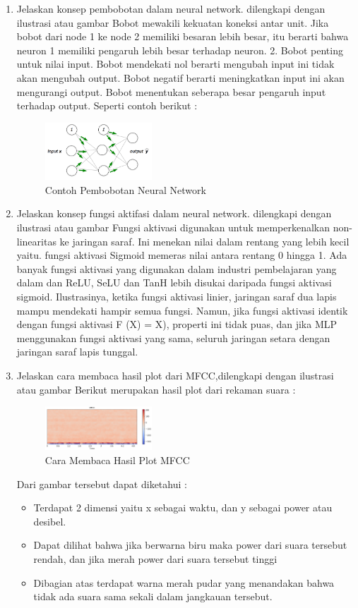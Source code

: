 \begin{enumerate}
	\item Jelaskan konsep pembobotan dalam neural network. dilengkapi dengan ilustrasi atau gambar
	\hfill\break
	Bobot mewakili kekuatan koneksi antar unit. Jika bobot dari node 1 ke node 2 memiliki besaran lebih besar, itu berarti bahwa neuron 1 memiliki pengaruh lebih besar terhadap neuron. 2. Bobot penting untuk nilai input. Bobot mendekati nol berarti mengubah input ini tidak akan mengubah output. Bobot negatif berarti meningkatkan input ini akan mengurangi output. Bobot menentukan seberapa besar pengaruh input terhadap output. Seperti contoh berikut :
	\begin{figure}[H]
		\includegraphics[width=4cm]{figures/1174087/6/2.png}
		\centering
		\caption{Contoh Pembobotan Neural Network}
	\end{figure}

	\item Jelaskan konsep fungsi aktifasi dalam neural network. dilengkapi dengan ilustrasi atau gambar
	\hfill\break
	Fungsi aktivasi digunakan untuk memperkenalkan non-linearitas ke jaringan saraf. Ini menekan nilai dalam rentang yang lebih kecil yaitu. fungsi aktivasi Sigmoid memeras nilai antara rentang 0 hingga 1. Ada banyak fungsi aktivasi yang digunakan dalam industri pembelajaran yang dalam dan ReLU, SeLU dan TanH lebih disukai daripada fungsi aktivasi sigmoid. Ilustrasinya, ketika fungsi aktivasi linier, jaringan saraf dua lapis mampu mendekati hampir semua fungsi. Namun, jika fungsi aktivasi identik dengan fungsi aktivasi F (X) = X), properti ini tidak puas, dan jika MLP menggunakan fungsi aktivasi yang sama, seluruh jaringan setara dengan jaringan saraf lapis tunggal.

	\item Jelaskan cara membaca hasil plot dari MFCC,dilengkapi dengan ilustrasi atau gambar
	\hfill\break
	Berikut merupakan hasil plot dari rekaman suara :
	\begin{figure}[H]
		\includegraphics[width=4cm]{figures/1174087/6/3.png}
		\centering
		\caption{Cara Membaca Hasil Plot MFCC}
	\end{figure}
	Dari gambar tersebut dapat diketahui :
	\begin{itemize}
		\item Terdapat 2 dimensi yaitu x sebagai waktu, dan y sebagai power atau desibel.
		\item Dapat dilihat bahwa jika berwarna biru maka power dari suara tersebut rendah, dan jika merah power dari suara tersebut tinggi
		\item Dibagian atas terdapat warna merah pudar yang menandakan bahwa tidak ada suara sama sekali dalam jangkauan tersebut.
	\end{itemize}
	

\end{enumerate}
